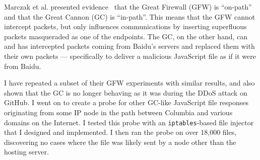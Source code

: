 Marczak et al. presented evidence~\cite{Marczak2015} that the Great Firewall (GFW) is “on-path” and that the Great Cannon (GC) is “in-path”.
This means that the GFW cannot intercept packets, but only influences communications by inserting superfluous packets masqueraded as one of the endpoints.
The GC, on the other hand, can and has intercepted packets coming from Baidu's servers and replaced them with their own packets --– specifically to deliver a malicious JavaScript file as if it were from Baidu.

I have repeated a subset of their GFW experiments with similar results, and also shown that the GC is no longer behaving as it was during the DDoS attack on GitHub.
I went on to create a probe for other GC-like JavaScript file responses originating from some IP node in the path between Columbia and various domains on the Internet.
I tested this probe with an \texttt{iptables}-based file injector that I designed and implemented.
I then ran the probe on over 18,000 files, discovering no cases where the file was likely sent by a node other than the hosting server.